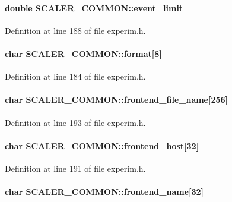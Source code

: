 \paragraph[{event\_\-limit}]{\setlength{\rightskip}{0pt plus 5cm}double {\bf SCALER\_\-COMMON::event\_\-limit}}\hfill\label{structSCALER__COMMON_ab4df1465cb062b9a4cee6f63b44ea132}


Definition at line 188 of file experim.h.
\paragraph[{format}]{\setlength{\rightskip}{0pt plus 5cm}char {\bf SCALER\_\-COMMON::format}\mbox{[}8\mbox{]}}\hfill\label{structSCALER__COMMON_a069829b48157f0db31149fd2794031c1}


Definition at line 184 of file experim.h.
\paragraph[{frontend\_\-file\_\-name}]{\setlength{\rightskip}{0pt plus 5cm}char {\bf SCALER\_\-COMMON::frontend\_\-file\_\-name}\mbox{[}256\mbox{]}}\hfill\label{structSCALER__COMMON_ae6e9f248c8e5c28d461e6d7e1d420eda}


Definition at line 193 of file experim.h.
\paragraph[{frontend\_\-host}]{\setlength{\rightskip}{0pt plus 5cm}char {\bf SCALER\_\-COMMON::frontend\_\-host}\mbox{[}32\mbox{]}}\hfill\label{structSCALER__COMMON_a7ecbc498f2d2e8515628377429fb11af}


Definition at line 191 of file experim.h.
\paragraph[{frontend\_\-name}]{\setlength{\rightskip}{0pt plus 5cm}char {\bf SCALER\_\-COMMON::frontend\_\-name}\mbox{[}32\mbox{]}}\hfill\label{structSCALER__COMMON_aff4f4f15b575ed7116f376083192143a}


